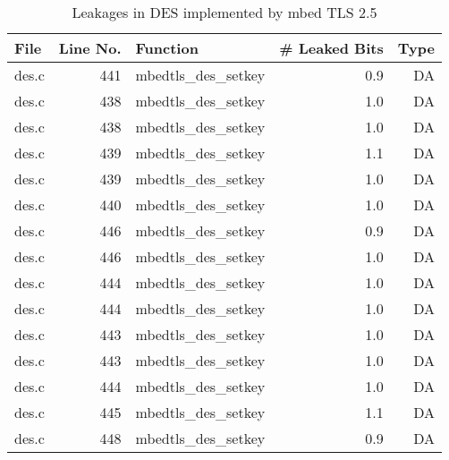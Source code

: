 \begin{table}[!ht]
\centering\tiny\scriptsize
\caption{Leakages in DES implemented by mbed TLS 2.5}\label{tab:DESmbed TLS2.5}
\begin{tabular}{lrlrr}
\hline
\textbf{File} & \textbf{Line No.} & \textbf{Function} & \textbf{\# Leaked Bits} & \textbf{Type} \\\hline
des.c& 441&mbedtls\_des\_setkey&0.9 &DA\\
des.c& 438&mbedtls\_des\_setkey&1.0 &DA\\
des.c& 438&mbedtls\_des\_setkey&1.0 &DA\\
des.c& 439&mbedtls\_des\_setkey&1.1 &DA\\
des.c& 439&mbedtls\_des\_setkey&1.0 &DA\\
des.c& 440&mbedtls\_des\_setkey&1.0 &DA\\
des.c& 446&mbedtls\_des\_setkey&0.9 &DA\\
des.c& 446&mbedtls\_des\_setkey&1.0 &DA\\
des.c& 444&mbedtls\_des\_setkey&1.0 &DA\\
des.c& 444&mbedtls\_des\_setkey&1.0 &DA\\
des.c& 443&mbedtls\_des\_setkey&1.0 &DA\\
des.c& 443&mbedtls\_des\_setkey&1.0 &DA\\
des.c& 444&mbedtls\_des\_setkey&1.0 &DA\\
des.c& 445&mbedtls\_des\_setkey&1.1 &DA\\
des.c& 448&mbedtls\_des\_setkey&0.9 &DA\\
\hline
\end{tabular}
\renewcommand{\baselinestretch}{1.0}\selectfont
\end{table}
